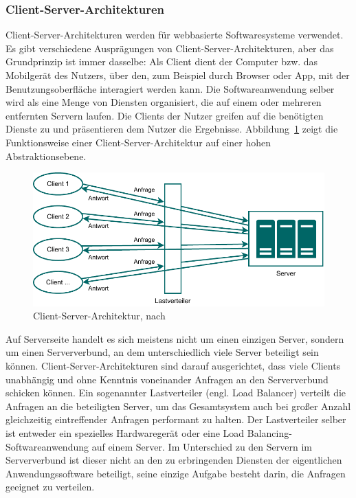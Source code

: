 \subsubsection{Client-Server-Architekturen}
\label{sec:Kap-7.1.2.2}

Client-Server-Architekturen werden für webbasierte Softwaresysteme verwendet. Es gibt verschiedene Ausprägungen von Client-Server-Architekturen, aber das Grundprinzip ist immer dasselbe: Als Client dient der Computer bzw. das Mobilgerät des Nutzers, über den, zum Beispiel durch Browser oder App, mit der Benutzungs\-oberfläche interagiert werden kann. Die Softwareanwendung selber wird als eine Menge von Diensten organisiert, die auf einem oder mehreren entfernten Servern laufen. Die Clients der Nutzer greifen auf die benötigten Dienste zu und präsentieren dem Nutzer die Ergebnisse. Abbildung~\ref{fig:client_server_architektur} zeigt die Funktionsweise einer Client-Server-Architektur auf einer hohen Abstraktionsebene.

\vspace{\baselineskip} %
\vspace{\baselineskip} %

\begin{figure}[h!]
	\centering
	\includegraphics{Bilder/Kapitel-7/client_server_architektur.pdf}
	\caption[Client-Server-Architektur]{Client-Server-Architektur, nach \cite[114]{som20}}
	\label{fig:client_server_architektur}
\end{figure}

\vspace{\baselineskip} %

Auf Serverseite handelt es sich meistens nicht um einen einzigen Server, sondern um einen Serververbund, 
an dem unterschiedlich viele Server beteiligt sein können. Client-Server-Architekturen sind darauf ausgerichtet, dass viele Clients unabhängig und ohne Kenntnis voneinander Anfragen an den Serververbund schicken können. Ein sogenannter Lastverteiler (engl. Load Balancer) verteilt die Anfragen an die beteiligten Server, um das Gesamtsystem auch bei großer Anzahl gleichzeitig eintreffender Anfragen performant zu halten. Der Lastverteiler selber ist entweder ein spezielles Hardwaregerät oder eine Load Balancing-Softwareanwendung auf einem Server. Im Unterschied zu den Servern im Serververbund ist dieser nicht an den zu erbringenden Diensten der eigentlichen Anwendungssoftware beteiligt, seine einzige Aufgabe besteht darin, die Anfragen geeignet zu verteilen.

